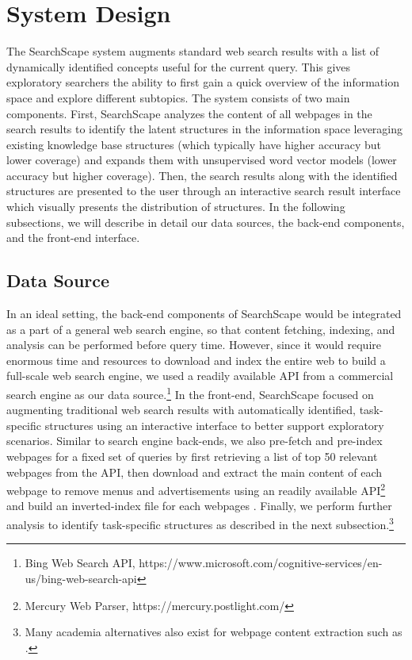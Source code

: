 \section{System Design}
The SearchScape system augments standard web search results with a list of dynamically identified concepts useful for the current query. This gives exploratory searchers the ability to first gain a quick overview of the information space and explore different subtopics. The system consists of two main components. First, SearchScape analyzes the content of all webpages in the search results to identify the latent structures in the information space leveraging existing knowledge base structures (which typically have higher accuracy but lower coverage) and expands them with unsupervised word vector models (lower accuracy but higher coverage). Then, the search results along with the identified structures are presented to the user through an interactive search result interface which visually presents the distribution of structures. In the following subsections, we will describe in detail our data sources, the back-end components, and the front-end interface.

\subsection{Data Source}

In an ideal setting, the back-end components of SearchScape would be integrated as a part of a general web search engine, so that content fetching, indexing, and analysis can be performed before query time. However, since it would require enormous time and resources to download and index the entire web to build a full-scale web search engine, we used a readily available API from a commercial search engine as our data source.\footnote{Bing Web Search API, https://www.microsoft.com/cognitive-services/en-us/bing-web-search-api} In the front-end, SearchScape focused on augmenting traditional web search results with automatically identified, task-specific structures using an interactive interface to better support exploratory scenarios. Similar to search engine back-ends, we also pre-fetch and pre-index webpages for a fixed set of queries by first retrieving a list of top 50 relevant webpages from the API, then download and extract the main content of each webpage to remove menus and advertisements using an readily available API\footnote{Mercury Web Parser, https://mercury.postlight.com/} and build an inverted-index file for each webpages \cite{baeza1999modern}.
Finally, we perform further analysis to identify task-specific structures as described in the next subsection.\footnote{Many academia alternatives also exist for webpage content extraction such as \cite{kohlschutter2010boilerplate}.}

